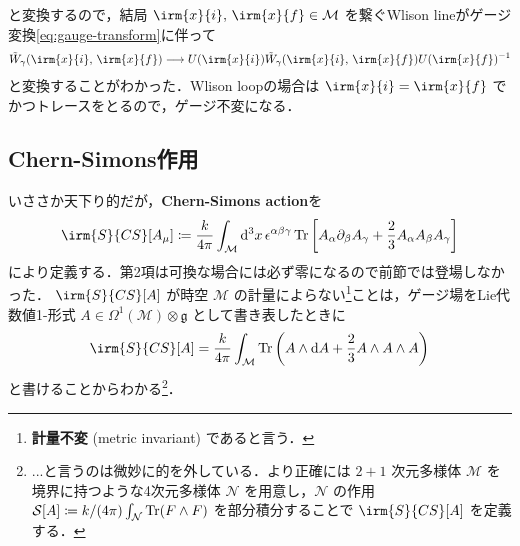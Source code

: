 \documentclass[TQFT_main]{subfiles}
\begin{document}
と変換するので，結局 $\irm{x}{i},\, \irm{x}{f} \in \mathcal{M}$ を繋ぐWlison lineがゲージ変換\eqref{eq:gauge-transform}に伴って
\begin{align}
    \tilde{W}_\gamma (\irm{x}{i},\, \irm{x}{f}) \lto U(\irm{x}{i}) \tilde{W}_\gamma (\irm{x}{i},\, \irm{x}{f}) U(\irm{x}{f})^{-1}
\end{align}
と変換することがわかった．Wlison loopの場合は $\irm{x}{i} = \irm{x}{f}$ でかつトレースをとるので，ゲージ不変になる．

\subsection{Chern-Simons作用}

いささか天下り的だが，\textbf{Chern-Simons action}を
\begin{align}
    \irm{S}{CS}[A_\mu] \coloneqq \frac{k}{4\pi} \int_{\mathcal{M}} \dd[3]{x} \epsilon^{\alpha\beta\gamma} \Tr \left[ A_\alpha \partial_\beta A_\gamma + \frac{2}{3} A_\alpha A_\beta A_\gamma \right] 
\end{align}
により定義する．第2項は可換な場合には必ず零になるので前節では登場しなかった．
$\irm{S}{CS}[A]$ が時空 $\mathcal{M}$ の計量によらない\footnote{\textbf{計量不変} (metric invariant) であると言う．}ことは，ゲージ場をLie代数値1-形式 $A \in \Omega^1(\mathcal{M}) \otimes \mathfrak{g}$ として書き表したときに
\begin{align}
    \irm{S}{CS}[A] = \frac{k}{4\pi} \int_{\mathcal{M}} \Tr \left( A \wedge \dd{A} + \frac{2}{3} A \wedge A \wedge A \right) 
\end{align}
と書けることからわかる\footnote{...と言うのは微妙に的を外している．より正確には $2+1$ 次元多様体 $\mathcal{M}$ を境界に持つような4次元多様体 $\mathcal{N}$ を用意し，$\mathcal{N}$ の作用 $\mathcal{S}[A] \coloneqq k/(4\pi) \int_{\mathcal{N}} \Tr (F \wedge F)$ を部分積分することで $\irm{S}{CS}[A]$ を定義する．}．
\end{document}
